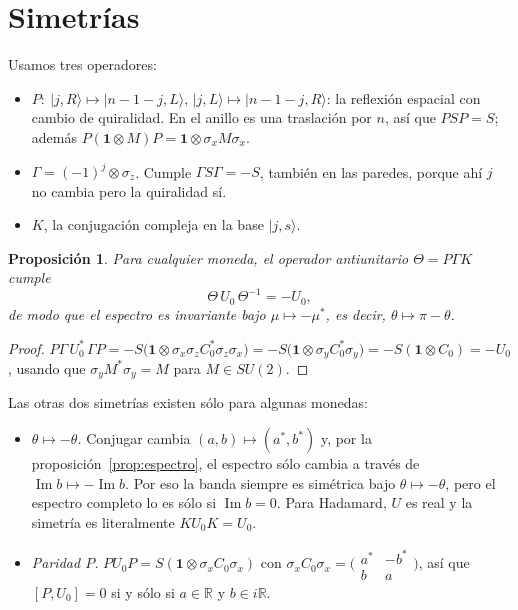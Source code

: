 \documentclass[11pt,a4paper]{article}
\newtheorem{proposicion}{Proposición}
\theoremstyle{remark}
\newcommand{\ket}[1]{\lvert #1\rangle}
\newcommand{\one}{\mathbf{1}}
\newcommand{\im}{\operatorname{Im}}
\begin{document}
\section{Simetrías}

Usamos tres operadores:
\begin{itemize}
\item $P:\ \ket{j,R}\mapsto\ket{n-1-j,L}$, $\ket{j,L}\mapsto\ket{n-1-j,R}$: la
reflexión espacial con cambio de quiralidad. En el anillo es una traslación por
$n$, así que $PSP=S$; además $P(\one\otimes M)P=\one\otimes\sigma_xM\sigma_x$.
\item $\Gamma=(-1)^j\otimes\sigma_z$. Cumple $\Gamma S\Gamma=-S$, también en las
paredes, porque ahí $j$ no cambia pero la quiralidad sí.
\item $K$, la conjugación compleja en la base $\ket{j,s}$.
\end{itemize}

\begin{proposicion}\label{prop:sim}
Para cualquier moneda, el operador antiunitario $\Theta=P\Gamma K$ cumple
\begin{equation}
\Theta\,U_0\,\Theta^{-1}=-U_0,
\end{equation}
de modo que el espectro es invariante bajo $\mu\mapsto-\mu^*$, es decir,
$\theta\mapsto\pi-\theta$.
\end{proposicion}
\begin{proof}
$P\Gamma\,U_0^*\,\Gamma P=-S\bigl(\one\otimes\sigma_x\sigma_zC_0^*\sigma_z\sigma_x\bigr)
=-S\bigl(\one\otimes\sigma_yC_0^*\sigma_y\bigr)=-S(\one\otimes C_0)=-U_0$, usando
que $\sigma_yM^*\sigma_y=M$ para $M\in SU(2)$.
\end{proof}

Las otras dos simetrías existen sólo para algunas monedas:
\begin{itemize}
\item \emph{$\theta\mapsto-\theta$.} Conjugar cambia $(a,b)\mapsto(a^*,b^*)$ y, por
la proposición~\ref{prop:espectro}, el espectro sólo cambia a través de
$\im b\mapsto-\im b$. Por eso la banda siempre es simétrica bajo
$\theta\mapsto-\theta$, pero el espectro completo lo es sólo si $\im b=0$. Para
Hadamard, $U$ es real y la simetría es literalmente $KU_0K=U_0$.
\item \emph{Paridad $P$.} $PU_0P=S(\one\otimes\sigma_xC_0\sigma_x)$ con
$\sigma_xC_0\sigma_x=\bigl(\begin{smallmatrix}a^*&-b^*\\ b&a\end{smallmatrix}\bigr)$,
así que $[P,U_0]=0$ si y sólo si $a\in\mathbb R$ y $b\in i\mathbb R$.
\end{itemize}
\end{document}
